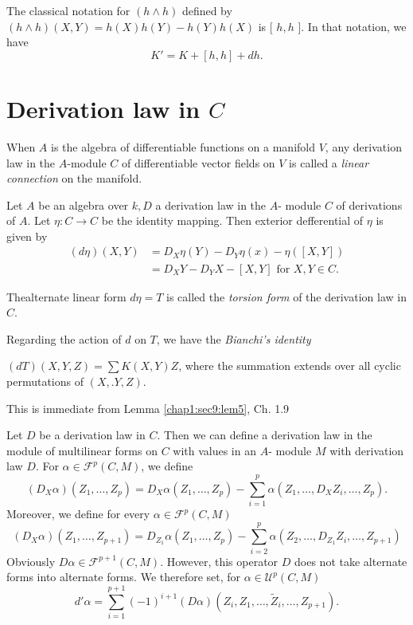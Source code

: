 The classical notation for $ ( h \wedge h ) $ defined by  $ ( h \wedge
h ) ( X,Y ) = h (X) h (Y) - h (Y) h (X) $ is [ $ h,h $ ]. In that
notation, we have  
$$
K' = K + [ h,h ] + dh. 
$$

\section{Derivation law in \texorpdfstring{$C$}{C}}\label{chap1:sec11} %

When $A$ is the algebra of differentiable functions on a manifold $V$,
any derivation law in the $A$-module $C$ of differentiable vector
fields on $V$ is called a \textit{linear connection } on the
manifold. 

Let $A$ be an algebra over $ k, D $ a derivation law in the $A$-
module $C$ of derivations of $A$. Let $ \eta : C \to C $ be the
identity mapping. Then exterior defferential of $\eta$ is given by  
\begin{align*}
  (d \eta) (X,Y) &= D_X \eta (Y) - D_Y \eta (x) - \eta ( [ X,Y ] ) \\
  &= D_X Y - D_Y X - [ X,Y] \text{ for } X,Y \in C.
\end{align*}

The\pageoriginale alternate linear form $ d \eta = T $ is called the \textit{
  torsion form } of the derivation law in $C$. 

Regarding the action of $d$ on $T$, we have the \textit{ Bianchi's
  identity } 

$ (dT) ( X,Y,Z ) = \sum K ( X,Y ) Z $, where the summation extends
over all cyclic permutations of $ ( X,.Y,Z ) $. 

This is immediate from Lemma \ref{chap1:sec9:lem5}, Ch. 1.9 

Let $D$ be a derivation law in $C$. Then we can define a derivation
law in the module of  multilinear forms on $C$ with values  in an $A$-
module $M$ with derivation law $D$. For $ \alpha \in \mathscr{F}^p (
C,M ) $, we define  
$$
( D_X \alpha ) ( Z_1, \ldots, Z_p ) = D_X \alpha ( Z_1, \ldots, Z_p )
- \sum^{p}_{i=1} \alpha ( Z_1, \ldots, D_X Z_i, \ldots, Z_p ).  
$$
Moreover, we define for every $\alpha \in \mathscr{F}^p (C, M)$
{\fontsize{10}{12}\selectfont
$$
( D_X \alpha ) ( Z_1, \ldots, Z_{p+1} ) = D_{Z_1} \alpha ( Z_1,
\ldots, Z_p ) - \sum^{p}_{i=2} \alpha ( Z_2, \ldots, D_{Z_1} Z_i,
\ldots, Z_{p+1}) 
$$}\relax
Obviously $ D \alpha \in \mathscr{F}^{p+1} ( C,M ) $. However, this
operator $D$ does not take  alternate forms into alternate forms. We
therefore set, for $ \alpha \in \mathscr{U}^p ( C,M ) $ 
$$
d' \alpha = \sum^{p+1}_{i=1} (-1)^{i+1} ( D \alpha ) ( Z_i, Z_1,
\ldots, \tilde{Z}_i, \ldots, Z_{p+1} ).  
$$

